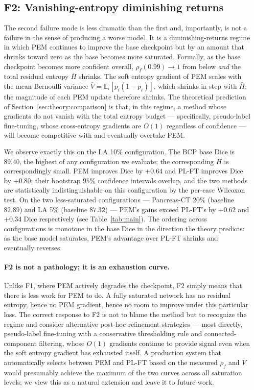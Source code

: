 \subsection{F2: Vanishing-entropy diminishing returns}
\label{sec:disc:f2}

The second failure mode is less dramatic than the first and, importantly, is not a failure in the sense of producing a worse model. It is a diminishing-returns regime in which PEM continues to improve the base checkpoint but by an amount that shrinks toward zero as the base becomes more saturated. Formally, as the base checkpoint becomes more confident overall, $\rho_f(0.99)\!\to\!1$ from below \emph{and} the total residual entropy $\bar H$ shrinks. The soft entropy gradient of PEM scales with the mean Bernoulli variance $\bar V\!=\!\mathbb{E}_i[p_i(1{-}p_i)]$, which shrinks in step with $\bar H$; the magnitude of each PEM update therefore shrinks. The theoretical prediction of Section~\ref{sec:theory:comparison} is that, in this regime, a method whose gradients do not vanish with the total entropy budget --- specifically, pseudo-label fine-tuning, whose cross-entropy gradients are $O(1)$ regardless of confidence --- will become competitive with and eventually overtake PEM.

We observe exactly this on the LA 10\% configuration. The BCP base Dice is $89.40$, the highest of any configuration we evaluate; the corresponding $\bar H$ is correspondingly small. PEM improves Dice by $+0.64$ and PL-FT improves Dice by $+0.80$; their bootstrap $95\%$ confidence intervals overlap, and the two methods are statistically indistinguishable on this configuration by the per-case Wilcoxon test. On the two less-saturated configurations --- Pancreas-CT 20\% (baseline $82.89$) and LA 5\% (baseline $87.32$) --- PEM's gains exceed PL-FT's by $+0.62$ and $+0.34$ Dice respectively (see Table~\ref{tab:main}). The ordering across configurations is monotone in the base Dice in the direction the theory predicts: as the base model saturates, PEM's advantage over PL-FT shrinks and eventually reverses.

\paragraph{F2 is not a pathology; it is an exhaustion curve.}
Unlike F1, where PEM actively degrades the checkpoint, F2 simply means that there is less work for PEM to do. A fully saturated network has no residual entropy, hence no PEM gradient, hence no room to improve under this particular loss. The correct response to F2 is not to blame the method but to recognize the regime and consider alternative post-hoc refinement strategies --- most directly, pseudo-label fine-tuning with a conservative thresholding rule and connected-component filtering, whose $O(1)$ gradients continue to provide signal even when the soft entropy gradient has exhausted itself. A production system that automatically selects between PEM and PL-FT based on the measured $\rho_f$ and $\bar V$ would presumably achieve the maximum of the two curves across all saturation levels; we view this as a natural extension and leave it to future work.

